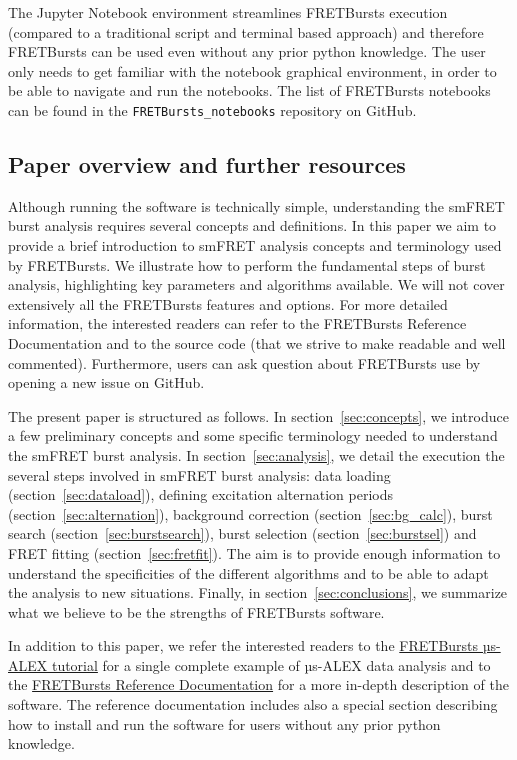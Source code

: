 The Jupyter Notebook environment streamlines FRETBursts execution (compared to
a traditional script and terminal based approach) and therefore
FRETBursts can be used even without any prior python knowledge.
The user only needs to get familiar with the
notebook graphical environment, in order to be able to navigate and run the notebooks.
The list of FRETBursts notebooks can be found in the
\verb|FRETBursts_notebooks| repository on GitHub.

\subsection{Paper overview and further resources}

Although running the software is technically simple, understanding the smFRET
burst analysis requires several concepts and definitions.
In this paper we aim to provide a brief introduction to smFRET analysis concepts
and terminology used by FRETBursts. We illustrate how to perform
the fundamental steps of burst analysis, highlighting key parameters
and algorithms available. We will not cover extensively all the FRETBursts
features and options. For more detailed information, the interested readers can refer
to the FRETBursts Reference Documentation and to the source code (that we strive
to make readable and well commented).
Furthermore, users can ask question about FRETBursts use by opening a new issue on GitHub.

The present paper is structured as follows.
In section~\ref{sec:concepts}, we
introduce a few preliminary concepts and some specific terminology needed
to understand the smFRET burst analysis.
In section~\ref{sec:analysis}, we detail the execution the several steps involved
in smFRET burst analysis: data loading (section~\ref{sec:dataload}), defining
excitation alternation periods (section~\ref{sec:alternation}), background
correction (section~\ref{sec:bg_calc}), burst search (section~\ref{sec:burstsearch}),
burst selection (section~\ref{sec:burstsel}) and FRET fitting (section~\ref{sec:fretfit}).
The aim is to provide enough information to understand the specificities of
the different algorithms and to be able to adapt the analysis to new situations.
Finally, in section~\ref{sec:conclusions}, we summarize what we believe to be
the strengths of FRETBursts software.

In addition to this paper, we refer the interested readers to the
\href{http://nbviewer.ipython.org/github/tritemio/FRETBursts_notebooks/blob/master/notebooks/FRETBursts\%20-\%20us-ALEX\%20smFRET\%20burst\%20analysis.ipynb}{FRETBursts µs-ALEX tutorial}
for a single complete example of µs-ALEX data analysis and to the
\href{http://fretbursts.readthedocs.org/}{FRETBursts Reference Documentation}
for a more in-depth description of the software. The reference documentation
includes also a special section describing how to install and run the software
for users without any prior python knowledge.

